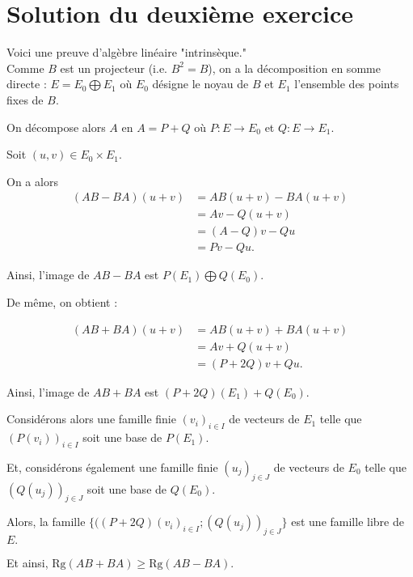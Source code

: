 
\section{Solution du deuxième exercice}

Voici une preuve d'algèbre linéaire "intrinsèque."\\

Comme $B$ est un projecteur (i.e. $B^{2}=B$), on a la décomposition en somme directe : $\displaystyle E=E_{0}\bigoplus E_{1}$ où $E_{0}$ désigne le noyau de $B$ et $E_{1}$ l'ensemble des points fixes de $B.$

On décompose alors $A$ en $A=P+Q$ où $P : E\rightarrow E_{0}$ et $Q : E\rightarrow E_{1}.$

Soit $(u,v)\in E_{0}\times E_{1}.$

On a alors 
\begin{align*}
(AB-BA)(u+v) & = AB(u+v)-BA(u+v)\\
& = Av-Q(u+v)\\
& = (A-Q)v-Qu\\
& =Pv-Qu.
\end{align*}

Ainsi, l'image de $AB-BA$ est $\displaystyle P(E_{1})\bigoplus Q(E_{0}).$

De même, on obtient : 

\begin{align*}
(AB+BA)(u+v) & = AB(u+v)+BA(u+v)\\
& = Av+Q(u+v)\\
& = (P+2Q)v+Qu.
\end{align*}

Ainsi, l'image de $AB+BA$ est $\displaystyle (P+2Q)(E_{1})+Q(E_{0}).$

Considérons alors une famille finie $(v_{i})_{i\in I}$ de vecteurs de $E_{1}$ telle que $(P(v_{i}))_{i\in I}$ soit une base de $P(E_{1}).$

Et, considérons également une famille finie $(u_{j})_{j\in J}$ de vecteurs de $E_{0}$ telle que $(Q(u_{j}))_{j\in J}$ soit une base de $Q(E_{0}).$

Alors, la famille $\{((P+2Q)(v_{i})_{i\in I};(Q(u_{j}))_{j\in J}\}$ est une famille libre de $E.$

Et ainsi, $\boxed{\displaystyle \mbox{Rg}(AB+BA)\geq \mbox{Rg}(AB-BA).}$

